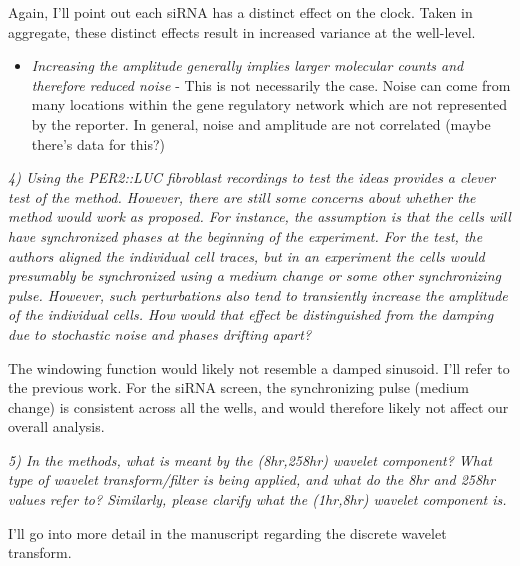 \documentclass[11pt, letterpaper]{article}
\newenvironment{reviewer}{\itshape\color{gray}}{}
\begin{document}
Again, I'll point out each siRNA has a distinct effect on the clock. Taken in aggregate, these distinct effects result in increased variance at the well-level.
\begin{itemize}
  \item {\itshape Increasing the amplitude generally implies larger molecular counts and therefore reduced noise} - This is not necessarily the case. Noise can come from many locations within the gene regulatory network which are not represented by the reporter. In general, noise and amplitude are not correlated (maybe there's data for this?)
\end{itemize}


\begin{reviewer}
4) Using the PER2::LUC fibroblast recordings to test the ideas provides a clever test of the method. However, there are still some concerns about whether the method would work as proposed. For instance, the assumption is that the cells will have synchronized phases at the beginning of the experiment. For the test, the authors aligned the individual cell traces, but in an experiment the cells would presumably be synchronized using a medium change or some other synchronizing pulse. However, such perturbations also tend to transiently increase the amplitude of the individual cells. How would that effect be distinguished from the damping due to stochastic noise and phases drifting apart?
\end{reviewer}

The windowing function would likely not resemble a damped sinusoid. I'll refer to the previous work. For the siRNA screen, the synchronizing pulse (medium change) is consistent across all the wells, and would therefore likely not affect our overall analysis.

\begin{reviewer}
5) In the methods, what is meant by the (8hr,258hr) wavelet component? What type of wavelet transform/filter is being applied, and what do the 8hr and 258hr values refer to? Similarly, please clarify what the (1hr,8hr) wavelet component is.
\end{reviewer}

I'll go into more detail in the manuscript regarding the discrete wavelet transform.
\end{document}
